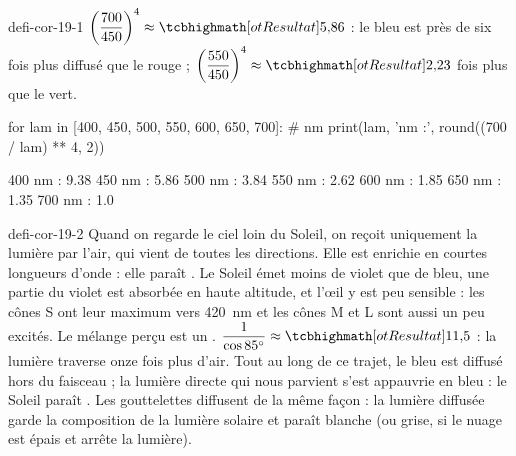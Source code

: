 \begin{blocEdition}{defi-cor-19-1}
$\left(\dfrac{700}{450}\right)^4\approx\res{5{,}86}$ : le bleu est près de six fois plus diffusé que le rouge ; $\left(\dfrac{550}{450}\right)^4\approx\res{2{,}23}$ fois plus que le vert.
\begin{python}
for lam in [400, 450, 500, 550, 600, 650, 700]:   # nm
    print(lam, 'nm :', round((700 / lam) ** 4, 2))
\end{python}
\begin{console}
400 nm : 9.38
450 nm : 5.86
500 nm : 3.84
550 nm : 2.62
600 nm : 1.85
650 nm : 1.35
700 nm : 1.0
\end{console}
\label{figedition-defi-cor-19-1-1}
\end{blocEdition}

\begin{blocEdition}{defi-cor-19-2}
Quand on regarde le ciel loin du Soleil, on reçoit uniquement la lumière  par l'air, qui vient de toutes les directions. Elle
est enrichie en courtes longueurs d'onde : elle paraît .
Le Soleil émet moins de violet que de bleu, une partie du violet est absorbée en haute altitude, et l'œil y est peu sensible : les cônes
S ont leur maximum vers \qty{420}{nm} et les cônes M et L sont aussi un peu excités. Le mélange perçu est un .
$\dfrac{1}{\cos\ang{85}}\approx\res{11{,}5}$ : la lumière traverse onze fois plus d'air. Tout au long de ce trajet, le bleu est diffusé hors du faisceau ; la lumière
directe qui nous parvient s'est appauvrie en bleu : le Soleil paraît .
Les gouttelettes diffusent  de la même façon : la lumière diffusée garde la composition de la lumière solaire et paraît
blanche (ou grise, si le nuage est épais et arrête la lumière).
\end{blocEdition}

